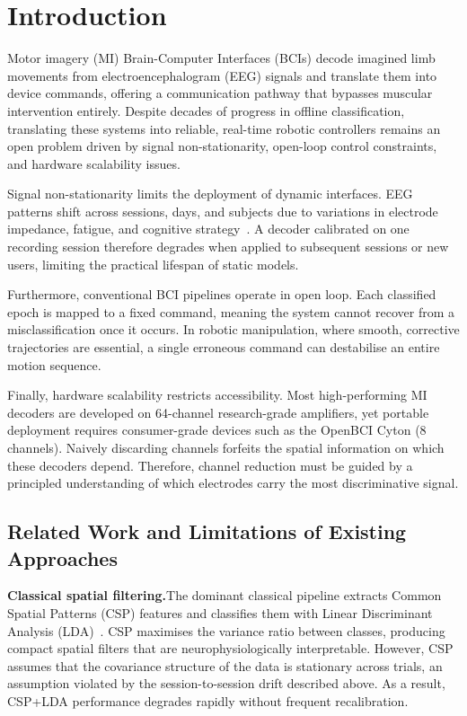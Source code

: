 \documentclass[12pt, a4paper]{article}
\begin{document}
\section{Introduction}

Motor imagery (MI) Brain-Computer Interfaces (BCIs) decode imagined limb movements from electroencephalogram (EEG) signals and translate them into device commands, offering a communication pathway that bypasses muscular intervention entirely. Despite decades of progress in offline classification, translating these systems into reliable, real-time robotic controllers remains an open problem driven by signal non-stationarity, open-loop control constraints, and hardware scalability issues.

Signal non-stationarity limits the deployment of dynamic interfaces. EEG patterns shift across sessions, days, and subjects due to variations in electrode impedance, fatigue, and cognitive strategy~\cite{hameed2025enhancing}. A decoder calibrated on one recording session therefore degrades when applied to subsequent sessions or new users, limiting the practical lifespan of static models.

Furthermore, conventional BCI pipelines operate in open loop. Each classified epoch is mapped to a fixed command, meaning the system cannot recover from a misclassification once it occurs. In robotic manipulation, where smooth, corrective trajectories are essential, a single erroneous command can destabilise an entire motion sequence.

Finally, hardware scalability restricts accessibility. Most high-performing MI decoders are developed on 64-channel research-grade amplifiers, yet portable deployment requires consumer-grade devices such as the OpenBCI Cyton (8 channels). Naively discarding channels forfeits the spatial information on which these decoders depend. Therefore, channel reduction must be guided by a principled understanding of which electrodes carry the most discriminative signal.

\subsection{Related Work and Limitations of Existing Approaches}

\textbf{Classical spatial filtering.}\quad The dominant classical pipeline extracts Common Spatial Patterns (CSP) features and classifies them with Linear Discriminant Analysis (LDA)~\cite{hameed2025enhancing}. CSP maximises the variance ratio between classes, producing compact spatial filters that are neurophysiologically interpretable. However, CSP assumes that the covariance structure of the data is stationary across trials, an assumption violated by the session-to-session drift described above. As a result, CSP+LDA performance degrades rapidly without frequent recalibration.
\end{document}
